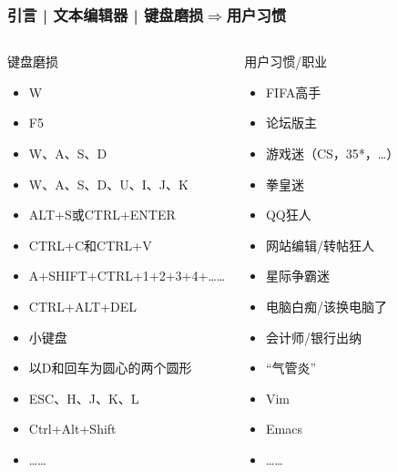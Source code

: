 \begin{frame}
  \frametitle{引言 | 文本编辑器 | 键盘磨损$\Rightarrow$用户习惯}
  \vspace{-0.5em}
  \begin{columns}
  \begin{block}{键盘磨损}
    \begin{itemize}
      \item W
      \item F5
      \item W、A、S、D
      \item W、A、S、D、U、I、J、K
      \item ALT+S或CTRL+ENTER
      \item CTRL+C和CTRL+V
      \item A+SHIFT+CTRL+1+2+3+4+……
      \item CTRL+ALT+DEL
      \item 小键盘
      \item 以D和回车为圆心的两个圆形
      \item ESC、H、J、K、L
      \item Ctrl+Alt+Shift
      \item ……
    \end{itemize}
   \end{block}
   \pause
   \begin{block}{用户习惯/职业}
    \begin{itemize}
      \item FIFA高手
      \item 论坛版主
      \item 游戏迷（CS，35*，…）
      \item 拳皇迷
      \item QQ狂人
      \item 网站编辑/转帖狂人
      \item 星际争霸迷
      \item 电脑白痴/该换电脑了
      \item 会计师/银行出纳
      \item “气管炎”
      \item Vim
      \item Emacs
      \item ……
    \end{itemize}
   \end{block}
 \end{columns}
\end{frame}

